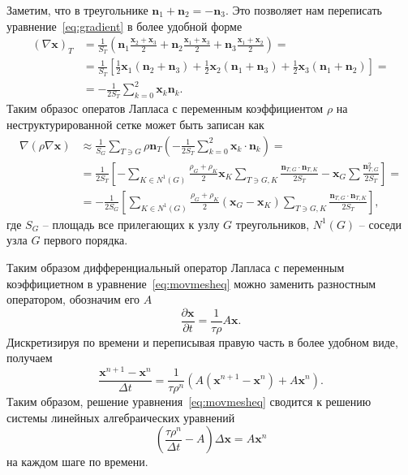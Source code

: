Заметим, что в треугольнике $\mathbf{n}_1+\mathbf{n}_2 = -\mathbf{n}_3$. Это позволяет нам переписать уравнение~\eqref{eq:gradient} в более удобной форме
\begin{equation}
\begin{split}
(\nabla \mathbf{x})_T &= \frac{1}{S_T}\left( \mathbf{n}_1 \frac{\mathbf{x}_2+\mathbf{x}_3}{2} + \mathbf{n}_2 \frac{\mathbf{x}_1+\mathbf{x}_3}{2} +\mathbf{n}_3 \frac{\mathbf{x}_1+\mathbf{x}_2}{2} \right)=\\
&= \frac{1}{S_T}\left[\frac{1}{2}\mathbf{x}_1(\mathbf{n}_2+\mathbf{n}_3) + \frac{1}{2}\mathbf{x}_2(\mathbf{n}_1+\mathbf{n}_3) + \frac{1}{2}\mathbf{x}_3(\mathbf{n}_1+\mathbf{n}_2) \right]=\\
&=-\frac{1}{2S_T}\sum_{k=0}^{2}\mathbf{x}_k\mathbf{n}_k.
\end{split}
\end{equation}
Таким образос оператов Лапласа с переменным коэффициентом $\rho$ на неструктурированной сетке может быть записан как
\begin{equation}
\begin{split}
\nabla(\rho \nabla \mathbf{x})
&\approx \frac{1}{S_G}\sum_{T\ni G}\rho \mathbf{n}_T \left(-\frac{1}{2S_T}\sum_{k=0}^{2}\mathbf{x}_k\cdot\mathbf{n}_k\right) =\\
&= \frac{1}{2S_T}\left[-\sum_{K\in N^1(G)}\frac{\rho_G + \rho_K}{2}\mathbf{x}_K \sum_{T\ni G,K}\frac{\mathbf{n}_{T,G} \cdot \mathbf{n}_{T,K}}{2S_T} - \mathbf{x}_G \sum \frac{\mathbf{n}_{T,G}^2}{2S_T}\right] =\\
&=-\frac{1}{2S_G}\left[ \sum_{K\in N^1(G)} \frac{\rho_G + \rho_K}{2} (\mathbf{x}_G - \mathbf{x}_K) \sum_{T\ni G,K}\frac{\mathbf{n}_{T,G} \cdot \mathbf{n}_{T,K}}{2S_T} \right],
\end{split}
\end{equation}
где $S_G$ -- площадь все прилегающих к узлу  $G$ треугольников, $N^1(G)$ -- соседи узла $G$ первого порядка.

Таким образом дифференциальный оператор Лапласа с переменным коэффициетном в уравнение~\eqref{eq:movmesheq} можно заменить разностным оператором, обозначим его $A$
\begin{equation}
\frac{\partial \mathbf{x}}{\partial t} = \frac{1}{\tau \rho}A\mathbf{x}.
\end{equation}
Дискретизируя по времени и переписывая правую часть в более удобном виде, получаем
\begin{equation}
\frac{\mathbf{x}^{n+1} - \mathbf{x}^{n}}{\Delta t} = \frac{1}{\tau \rho^n}(A(\mathbf{x}^{n+1} -\mathbf{x}^n ) + A\mathbf{x}^{n}).
\end{equation}
Таким образом, решение уравнения~\eqref{eq:movmesheq} сводится к решению системы линейных алгебраических уравнений
\begin{equation}\label{eq:numerical}
\left(\frac{ \tau \rho^n}{\Delta t } - A\right) \Delta \mathbf{x} =  A\mathbf{x}^{n}
\end{equation}
на каждом шаге по времени.

